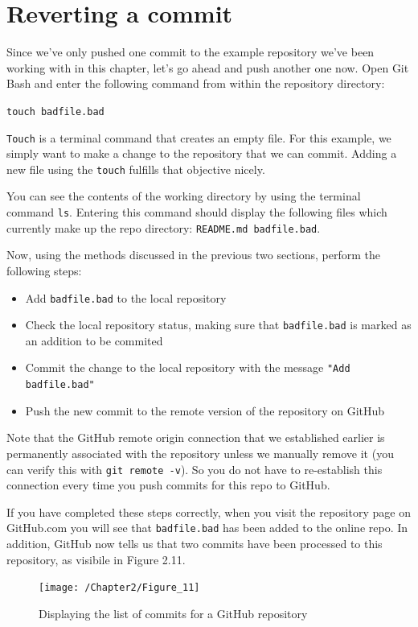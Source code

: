\documentclass{book}
\begin{document}
\section{Reverting a commit}
Since we've only pushed one commit to the example repository we've been working with in this chapter, let's go ahead and push another one now. Open Git Bash and enter the following command from within the repository directory:

\texttt{touch badfile.bad}

\texttt{Touch} is a terminal command that creates an empty file. For this example, we simply want to make a change to the repository that we can commit. Adding a new file using the \texttt{touch} fulfills that objective nicely.

You can see the contents of the working directory by using the terminal command \texttt{ls}. Entering this command should display the following files which currently make up the repo directory: \texttt{README.md badfile.bad}.

Now, using the methods discussed in the previous two sections, perform the following steps:

\begin{itemize}
	\item Add \texttt{badfile.bad} to the local repository
	\item Check the local repository status, making sure that \texttt{badfile.bad} is marked as an addition to be commited
	\item Commit the change to the local repository with the message \texttt{"Add badfile.bad"}
	\item Push the new commit to the remote version of the repository on GitHub
\end{itemize}

Note that the GitHub remote origin connection that we established earlier is permanently associated with the repository unless we manually remove it (you can verify this with \texttt{git remote -v}). So you do not have to re-establish this connection every time you push commits for this repo to GitHub.

If you have completed these steps correctly, when you visit the repository page on GitHub.com you will see that \texttt{badfile.bad} has been added to the online repo. In addition, GitHub now tells us that two commits have been processed to this repository, as visibile in Figure 2.11.

\begin{figure}[h]
	\caption{Displaying the list of commits for a GitHub repository}
	\centering\texttt{[image: /Chapter2/Figure\_11]}
\end{figure}
\end{document}
